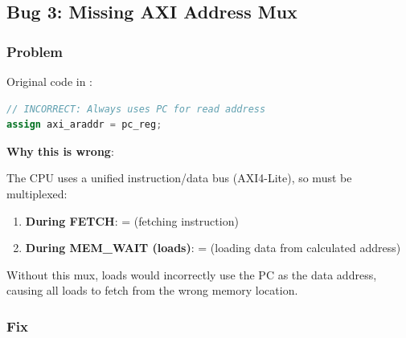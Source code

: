 \subsection{Bug 3: Missing AXI Address Mux}\label{cr:fix:critical-fixes:bug-3-missing-axi-address-mux}

\subsubsection{Problem}\label{cr:fix:critical-fixes:problem-2}

\begin{record}

Original code in :

\begin{lstlisting}[language=Verilog]
// INCORRECT: Always uses PC for read address
assign axi_araddr = pc_reg;
\end{lstlisting}

\textbf{Why this is wrong}:

The CPU uses a unified instruction/\allowbreak{}data bus (AXI4-Lite), so
 must be multiplexed:

\begin{enumerate}
\def\labelenumi{\arabic{enumi}.}
\tightlist
\item
  \textbf{During FETCH}:  =  (fetching
  instruction)
\item
  \textbf{During MEM\_WAIT (loads)}:  = 
  (loading data from calculated address)
\end{enumerate}

Without this mux, loads would incorrectly use the PC as the data
address, causing all loads to fetch from the wrong memory location.

\end{record}

\subsubsection{Fix}\label{cr:fix:critical-fixes:fix-2}

